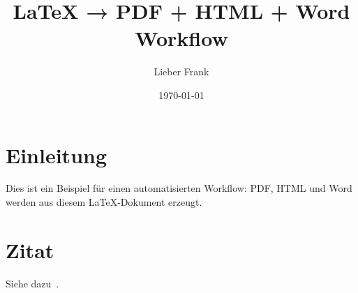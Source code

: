 \documentclass[11pt]{article}
\title{LaTeX → PDF + HTML + Word Workflow}
\author{Lieber Frank}
\date{\today}
\begin{document}
\maketitle

\section{Einleitung}
Dies ist ein Beispiel für einen automatisierten Workflow:
PDF, HTML und Word werden aus diesem \LaTeX-Dokument erzeugt.

\section{Zitat}
Siehe dazu~\cite{knuth1984}.

\printbibliography
\end{document}
